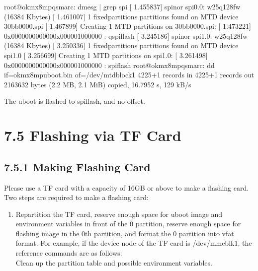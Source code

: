 \documentclass[letterpaper,10pt,openany,english]{sphinxmanual}
\begin{document}
\begin{sphinxVerbatim}[commandchars=\\\{\}]
root@ok\PYGZhy{}mx8mpq\PYGZhy{}smarc:\PYGZti{}\PYGZsh{} dmesg  | grep spi                         
[    1.455837] spi\PYGZhy{}nor spi0.0: w25q128fw (16384 Kbytes)
[    1.461007] 1 fixed\PYGZhy{}partitions partitions found on MTD device 30bb0000.spi
[    1.467899] Creating 1 MTD partitions on \PYGZdq{}30bb0000.spi\PYGZdq{}:
[    1.473221] 0x000000000000\PYGZhy{}0x000001000000 : \PYGZdq{}qspiflash\PYGZdq{}
[    3.245186] spi\PYGZhy{}nor spi1.0: w25q128fw (16384 Kbytes)
[    3.250336] 1 fixed\PYGZhy{}partitions partitions found on MTD device spi1.0
[    3.256699] Creating 1 MTD partitions on \PYGZdq{}spi1.0\PYGZdq{}:
[    3.261498] 0x000000000000\PYGZhy{}0x000001000000 : \PYGZdq{}spiflash\PYGZdq{}
root@ok\PYGZhy{}mx8mpq\PYGZhy{}smarc:\PYGZti{}\PYGZsh{} dd if=ok\PYGZhy{}mx8mp\PYGZhy{}uboot.bin of=/dev/mtdblock1
4225+1 records in
4225+1 records out
2163632 bytes (2.2 MB, 2.1 MiB) copied, 16.7952 s, 129 kB/s
\end{sphinxVerbatim}

\sphinxAtStartPar
The uboot is flashed to spiflash, and no offset.


\section{7.5 Flashing via TF Card}
\label{\detokenize{linux-manual:flashing-via-tf-card}}

\subsection{7.5.1 Making Flashing Card}
\label{\detokenize{linux-manual:making-flashing-card}}
\sphinxAtStartPar
Please use a TF card with a capacity of 16GB or above to make a flashing card.\\
Two steps are required to make a flashing card:
\begin{enumerate}
%
\item {} 
\sphinxAtStartPar
Re\sphinxhyphen{}partition the TF card, reserve enough space for uboot image and environment variables in front of the 0 partition, reserve enough space for flashing image in the 0th partition, and format the 0 partition into vfat format. For example, if the device node of the TF card is /dev/mmcblk1, the reference commands are as follows:\\
Clean up the partition table and possible environment variables.

\end{enumerate}
\end{document}
